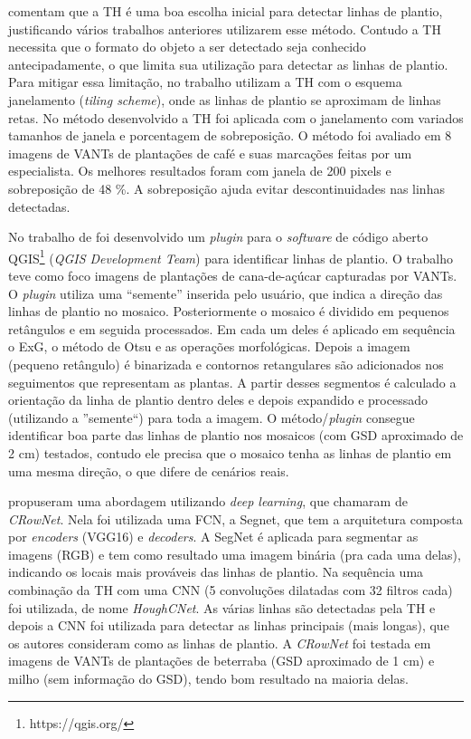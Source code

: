 \documentclass[12pt, a4paper, english, brazil]{article}
\newcommand{\dotsBlue}{\colorbox{orange}{\textcolor{blue}{\dots}}}
\begin{document}

 comentam que a TH é uma boa escolha inicial para detectar linhas de plantio, justificando vários trabalhos anteriores utilizarem esse método. Contudo a TH necessita que o formato do objeto a ser detectado seja conhecido antecipadamente, o que limita sua utilização para detectar as linhas de plantio. Para mitigar essa limitação, no trabalho utilizam a TH com o esquema janelamento (\textit{tiling scheme}), onde as linhas de plantio se aproximam de linhas retas. No método desenvolvido a TH foi aplicada com o janelamento com variados tamanhos de janela e porcentagem de sobreposição. O método foi avaliado em 8 imagens de VANTs de plantações de café e suas marcações feitas por um especialista. Os melhores resultados foram com janela de 200 pixels e sobreposição de 48 \%. A sobreposição ajuda evitar descontinuidades nas linhas detectadas.

No trabalho de  foi desenvolvido um \textit{plugin} para o \textit{software} de código aberto QGIS\footnote{https://qgis.org/} (\textit{QGIS Development Team}) para identificar linhas de plantio. O trabalho teve como foco imagens de plantações de cana-de-açúcar capturadas por VANTs. O \textit{plugin} utiliza uma ``semente'' inserida pelo usuário, que indica a direção das linhas de plantio no mosaico. Posteriormente o mosaico é dividido em pequenos retângulos e em seguida processados. Em cada um deles é aplicado em sequência o ExG, o método de Otsu e as operações morfológicas. Depois a imagem (pequeno retângulo) é binarizada e contornos retangulares são adicionados nos seguimentos que representam as plantas. A partir desses segmentos é calculado a orientação da linha de plantio dentro deles e depois expandido e processado (utilizando a ''semente``) para toda a imagem. O método/\textit{plugin} consegue identificar boa parte das linhas de plantio nos mosaicos (com GSD aproximado de 2 cm) testados, contudo ele precisa que o mosaico tenha as linhas de plantio em uma mesma direção, o que difere de cenários reais.

 propuseram uma abordagem utilizando \textit{deep learning}, que chamaram de \textit{CRowNet}. Nela foi utilizada uma FCN, a Segnet, que tem a arquitetura composta por \textit{encoders} (VGG16) e \textit{decoders}. A SegNet é aplicada para segmentar as imagens (RGB) e tem como resultado uma imagem binária (pra cada uma delas), indicando os locais mais prováveis das linhas de plantio. Na sequência uma combinação da TH com uma CNN (5 convoluções dilatadas com 32 filtros cada) foi utilizada, de nome \textit{HoughCNet}. As várias linhas são detectadas pela TH e depois a CNN foi utilizada para detectar as linhas principais (mais longas), que os autores consideram como as linhas de plantio. A \textit{CRowNet} foi testada em imagens de VANTs de plantações de beterraba (GSD aproximado de 1 cm) e milho (sem informação do GSD), tendo bom resultado na maioria delas.
\end{document}
